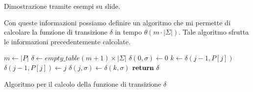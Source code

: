 \begin{nota}
    Dimostrazione tramite esempi su slide.
\end{nota}
Con queste informazioni possiamo definire un algoritmo che mi permette di calcolare
la funzione di transizione $\delta$ in tempo $\theta(m \cdot |\Sigma|)$. Tale
algoritmo sfrutta le informazioni precedentemente calcolate.
\begin{algorithm}[!ht]
    \begin{algorithmic}
        \State $m\gets |P|$
        \State $\delta \gets empty\_table (m + 1) \times | \Sigma|$
        \For{$\sigma \in \Sigma$}
        \State $\delta(0, \sigma) \gets 0$
        \EndFor
        \State $k \gets \delta(j - 1, P[j])$
        \State $\delta(j - 1, P[j]) \gets j$
        \For{$\sigma \in \Sigma$}
        \State $\delta(j, \sigma) \gets \delta(k, \sigma)$
        \EndFor
        \EndFor
        \State $\text{\textbf{return}} \ \delta$
        \EndFunction
    \end{algorithmic}
    \caption{Algoritmo per il calcolo della funzione di transizione $\delta$}
\end{algorithm}
\newpage
